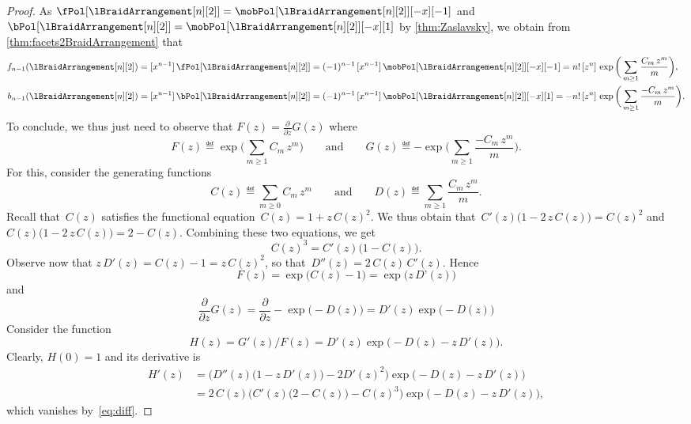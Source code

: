 \begin{proof}
As $\fPol[{\lBraidArrangement[n][2]}] = \mobPol[{\lBraidArrangement[n][2]}][-x][-1]$ and $\bPol[{\lBraidArrangement[n][2]}] = \mobPol[{\lBraidArrangement[n][2]}][-x][1]$ by \cref{thm:Zaslavsky}, we obtain from \cref{thm:facets2BraidArrangement} that
\begin{align*}
f_{n-1}(\lBraidArrangement[n][2]) & = [x^{n-1}] \, \fPol[{\lBraidArrangement[n][2]}] = (-1)^{n-1} \, [x^{n-1}] \, \mobPol[{\lBraidArrangement[n][2]}][-x][-1] = n! \, [z^n]  \, \exp \bigg( \sum_{m \ge 1} \frac{C_m \, z^m}{m} \bigg), \\
b_{n-1}(\lBraidArrangement[n][2]) & = [x^{n-1}] \, \bPol[{\lBraidArrangement[n][2]}] = (-1)^{n-1} \, [x^{n-1}] \, \mobPol[{\lBraidArrangement[n][2]}][-x][1] = - n! \, [z^n]  \, \exp \bigg( \sum_{m \ge 1} \frac{- C_m \, z^m}{m} \bigg).
\end{align*}
To conclude, we thus just need to observe that
\(
F(z) = \frac{\partial}{\partial z} G(z)
\)
where
\[
F(z) \eqdef \exp \bigg( \sum_{m \ge 1} C_m \, z^m \bigg)
\qquad\text{and}\qquad
G(z) \eqdef - \exp \bigg( \sum_{m \ge 1} \frac{- C_m \, z^m}{m} \bigg).
\]
For this, consider the generating functions
\[
C(z) \eqdef \sum_{m \ge 0} C_m \, z^m
\qquad\text{and}\qquad
D(z) \eqdef \sum_{m \ge 1} \frac{C_m \, z^m}{m}.
\]
Recall that~$C(z)$ satisfies the functional equation~$C(z) = 1 + z \, C(z)^2$.
We thus obtain that~$C'(z) \big( 1 - 2 \, z \, C(z) \big) = C(z)^2$ and $C(z) \big( 1 - 2 \, z \, C(z) \big) = 2 - C(z)$.
Combining these two equations, we get
\begin{equation}
\label{eq:diff}
C(z)^3 = C'(z) \big( 1 - C(z) \big).
\end{equation}
Observe now that $z \, D'(z) = C(z) - 1 = z \, C(z)^2$, so that~$D''(z) = 2 \, C(z) \, C'(z)$.
Hence
\[
F(z) = \exp \big( C(z) - 1 \big) = \exp \big( z \, D’(z) \big)
\]
and
\[
\frac{\partial}{\partial z} G(z) = \frac{\partial}{\partial z}  - \exp \big( -D(z) \big) = D'(z) \exp \big( -D(z) \big)
\]
Consider the function
\[
H(z) = G'(z) / F(z) = D'(z) \exp \big( -D(z) - z \, D'(z) \big).
\]
Clearly, $H(0) = 1$ and its derivative is
\begin{align*}
H'(z)
& = \Big( D''(z) \big(1 - z \, D'(z) \big) - 2 D'(z)^2 \Big) \exp \big( -D(z) - z \, D'(z) \big) \\
& = 2 \, C(z) \Big( C'(z) \big( 2 - C(z) \big) - C(z)^3 \Big) \exp \big( - D(z) - z \, D'(z) \big),
\end{align*}
which vanishes by~\eqref{eq:diff}.
\end{proof}

